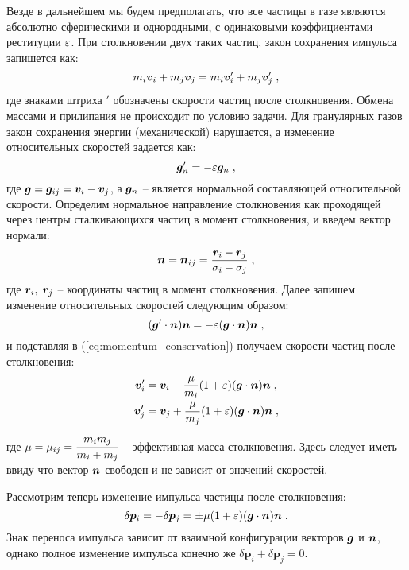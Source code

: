 Везде в дальнейшем мы будем предполагать, что все частицы в газе являются абсолютно сферическими и однородными,
с одинаковыми коэффициентами реституции $\varepsilon$. При столкновении двух таких частиц, закон сохранения импульса запишется как:
\begin{equation}\label{eq:momentum_conservation}
  m_i\bm{v}_i + m_j\bm{v}_j = m_i\bm{v}'_i+m_j\bm{v}'_j\;,
\end{equation}
где знаками штриха $'$ обозначены скорости частиц после столкновения. Обмена массами и прилипания не происходит по условию задачи.
Для гранулярных газов закон сохранения энергии (механической) нарушается, а изменение относительных скоростей задается как:
\begin{equation}
  \bm{g}'_{n} = -\varepsilon\bm{g}_{n}\;,
\end{equation}
где $\bm{g} = \bm{g}_{ij}=\bm{v}_i-\bm{v}_j$, а $\bm{g}_n$ -- является нормальной составляющей относительной скорости. Определим нормальное 
направление столкновения как проходящей через центры сталкивающихся частиц в момент столкновения, и введем вектор
нормали:
\begin{equation}
  \bm{n} = \bm{n}_{ij} = \frac{\bm{r}_i-\bm{r}_j}{\sigma_i-\sigma_j}\;,
\end{equation}
где $\bm{r}_i,\;\bm{r}_j$ -- координаты частиц в момент столкновения.
Далее запишем изменение относительных скоростей следующим образом:
\begin{equation}
  (\bm{g}'\cdot\bm{n})\bm{n} = -\varepsilon(\bm{g}\cdot\bm{n})\bm{n}\;,
\end{equation}
и подставляя в (\ref{eq:momentum_conservation}) получаем скорости частиц после столкновения:
\begin{equation}
  \begin{split}
    \bm{v}'_i &= \bm{v}_i - \frac{\mu}{m_i}(1+\varepsilon)(\bm{g}\cdot\bm{n})\bm{n}\;,\\
    \bm{v}'_j &= \bm{v}_j + \frac{\mu}{m_j}(1+\varepsilon)(\bm{g}\cdot\bm{n})\bm{n}\;,
  \end{split}  
\end{equation}
где $\mu=\mu_{ij}=\cfrac{m_im_j}{m_i+m_j}$ -- эффективная масса столкновения. Здесь следует иметь ввиду что вектор $\bm{n}$
свободен и не зависит от значений скоростей.

Рассмотрим теперь изменение импульса частицы после столкновения:
\begin{equation}
  \delta\bm{p}_i = -\delta\bm{p}_j = \pm\mu(1+\varepsilon)(\bm{g}\cdot\bm{n})\bm{n}\;.
\end{equation}
Знак переноса импульса зависит от взаимной конфигурации векторов $\bm{g}$ и $\bm{n}$, однако полное изменение импульса
конечно же $\delta\bm{p}_i+\delta\bm{p}_j=0$.

